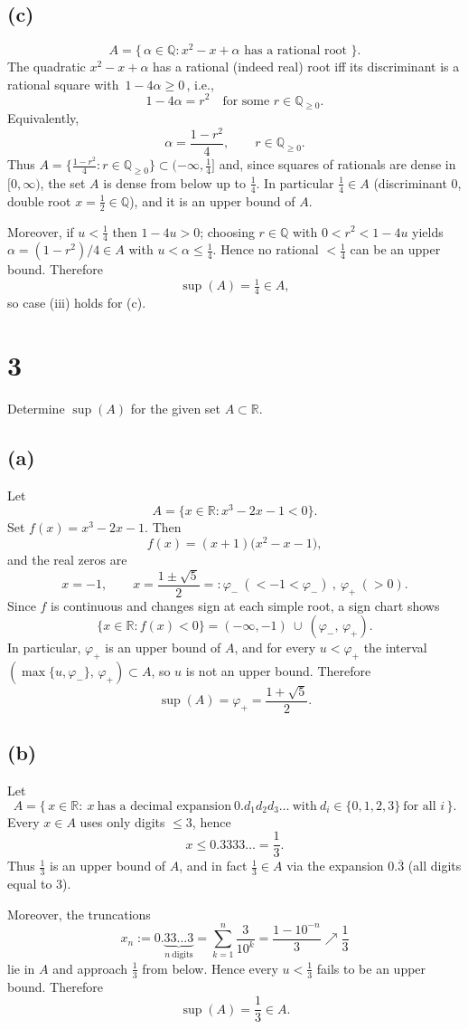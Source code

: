 \documentclass[12pt,a4paper]{article}
\theoremstyle{definition}
\theoremstyle{remark}
\begin{document}
\subsection*{(c)}
\[A 
	= \bigl\{\, \alpha\in\mathbb{Q} : x^2-x+\alpha \text{ has a rational root }\bigr\}.\]
The quadratic $x^2-x+\alpha$ has a rational (indeed real) root iff its discriminant is a rational square with $\,1-4\alpha\ge 0\,$, i.e.,
\[
 1-4\alpha = r^2 \quad \text{for some } r\in\mathbb{Q}_{\ge 0}.
\]
Equivalently,
\[
 \alpha = \frac{1-r^2}{4}, \qquad r\in\mathbb{Q}_{\ge 0}.
\]
Thus $A = \bigl\{\tfrac{1-r^2}{4} : r\in\mathbb{Q}_{\ge 0}\bigr\} \subset (-\infty,\tfrac14]$ and, since squares of rationals are dense in $[0,\infty)$, the set $A$ is dense from below up to $\tfrac14$. In particular $\tfrac14\in A$ (discriminant $0$, double root $x=\tfrac12\in\mathbb{Q}$), and it is an upper bound of $A$.

Moreover, if $u<\tfrac14$ then $1-4u>0$; choosing $r\in\mathbb{Q}$ with $0<r^2<1-4u$ yields $\alpha=(1-r^2)/4\in A$ with $u<\alpha\le \tfrac14$. Hence no rational $<\tfrac14$ can be an upper bound. Therefore
\[
 \sup(A) = \tfrac14\in A,
\]
so case (iii) holds for (c).


\section*{3}
Determine $\sup(A)$ for the given set $A\subset\mathbb{R}$.

\subsection*{(a)}
Let
\[
A=\{x\in\mathbb{R} : x^3-2x-1<0\}.
\]
Set $f(x)=x^3-2x-1$. Then
\[
f(x)=(x+1)\bigl(x^2-x-1\bigr),
\]
and the real zeros are
\[
x=-1,\qquad x=\frac{1\pm\sqrt{5}}{2}=: \varphi_{-}\ (<-1<\varphi_{-})\ ,\ \varphi_{+}\ (>0).
\]
Since $f$ is continuous and changes sign at each simple root, a sign chart shows
\[
\{x\in\mathbb{R}: f(x)<0\}=(-\infty,-1)\ \cup\ (\varphi_{-},\,\varphi_{+}).
\]
In particular, $\varphi_{+}$ is an upper bound of $A$, and for every $u<\varphi_{+}$ the interval 
$(\max\{u,\varphi_{-}\},\,\varphi_{+})\subset A$, so $u$ is not an upper bound. Therefore
\[
\sup(A)=\varphi_{+}=\frac{1+\sqrt{5}}{2}.
\]

\subsection*{(b)}
Let
\[
A=\bigl\{\,x\in\mathbb{R}:\ x\ \text{has a decimal expansion}\ 0.d_1d_2d_3\ldots\ \text{with}\ d_i\in\{0,1,2,3\}\ \text{for all }i\,\bigr\}.
\]
Every $x\in A$ uses only digits $\le 3$, hence
\[
x\le 0.3333\ldots=\frac{1}{3}.
\]
Thus $\tfrac{1}{3}$ is an upper bound of $A$, and in fact $\tfrac{1}{3}\in A$ via the expansion $0.\overline{3}$ (all digits equal to $3$).

Moreover, the truncations
\[
x_n:=0.\underbrace{33\ldots 3}_{n\ \text{digits}}
=\sum_{k=1}^n \frac{3}{10^k}
=\frac{1-10^{-n}}{3}
\nearrow \frac{1}{3}
\]
lie in $A$ and approach $\tfrac{1}{3}$ from below. Hence every $u<\tfrac{1}{3}$ fails to be an upper bound. Therefore
\[
\sup(A)=\frac{1}{3}\in A.
\]
\end{document}
